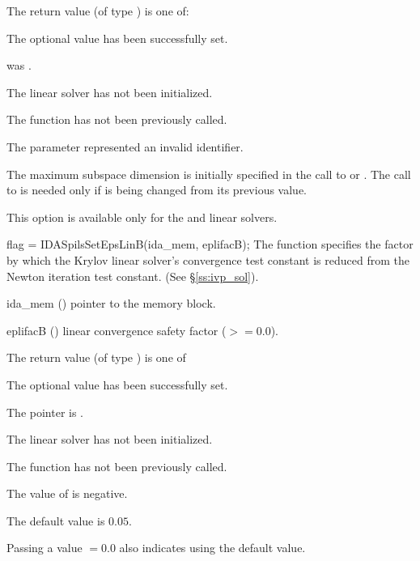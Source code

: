 {
  The return value  (of type ) is one of:
  \begin{args}
  \item[\Id{IDASPILS\_SUCCESS}] 
    The optional value has been successfully set.
  \item[\Id{IDASPILS\_MEM\_NULL}]
     was .
  \item[\Id{IDASPILS\_LMEM\_NULL}]
    The {\idaspils} linear solver has not been initialized.
  \item[\Id{IDASPILS\_NO\_ADJ}]
    The function  has not been previously called.
  \item[\Id{IDASPILS\_ILL\_INPUT}]
    The parameter  represented an invalid identifier.
  \end{args}
}
{
  The maximum subspace dimension is initially specified in the call
  to  or .  The call to 
  is needed only if  is being changed from its previous value.

  {\warn}This option is available only for the {\idaspbcg} and {\idasptfqmr} linear solvers.
}
{
  flag = IDASpilsSetEpsLinB(ida\_mem, eplifacB);
}
{
  The function  specifies the factor by
  which the Krylov linear solver's convergence test constant is reduced
  from the Newton iteration test constant. (See \S\ref{ss:ivp_sol}).
}
{
  \begin{args}
  \item[ida\_mem] ()
    pointer to the {\idas} memory block.
  \item[eplifacB] ()
    linear convergence safety factor ($>= 0.0$).
  \end{args}
}
{
  The return value  (of type ) is one of
  \begin{args}
  \item[\Id{IDASPILS\_SUCCESS}] 
    The optional value has been successfully set.
  \item[\Id{IDASPILS\_MEM\_NULL}]
    The  pointer is .
  \item[\Id{IDASPILS\_LMEM\_NULL}]
    The {\idaspils} linear solver has not been initialized.
  \item[\Id{IDASPILS\_NO\_ADJ}]
    The function  has not been previously called.
  \item[\Id{IDASPILS\_ILL\_INPUT}]
    The value of  is negative.
  \end{args}
}
{
  The default value is $0.05$.

  Passing a value $ = 0.0$ also indicates using the default value.
}

